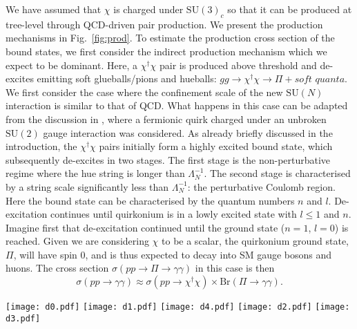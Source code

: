 We have assumed that $\chi$ is charged under $\mathrm{SU}(3)_{c}$ so that it can
be produced at tree-level through QCD-driven pair production. We present the
production mechanisms in Fig.~\ref{fig:prod}. To estimate the production cross
section of the bound states, we first consider the indirect production mechanism
which we expect to be dominant. Here, a $\chi^\dagger \chi$ pair is produced
above threshold and de-excites emitting soft glueballs/pions and hueballs:
$gg \rightarrow \chi^\dagger \chi \rightarrow \Pi + \textit{soft quanta}$. We
first consider the case where the confinement scale of the new $\mathrm{SU}(N)$
interaction is similar to that of QCD. What happens in this case can be adapted
from the discussion in \cite{Carlson:1991zn}, where a fermionic quirk charged
under an unbroken $\mathrm{SU}(2)$ gauge interaction was considered. As already
briefly discussed in the introduction, the $\chi^\dagger \chi$ pairs initially
form a highly excited bound state, which subsequently de-excites in two stages.
The first stage is the non-perturbative regime where the hue string is longer
than $\Lambda_{N}^{-1}$. The second stage is characterised by a string scale
significantly less than $\Lambda_{N}^{-1}$: the perturbative Coulomb region.
Here the bound state can be characterised by the quantum numbers $n$ and $l$.
De-excitation continues until quirkonium is in a lowly excited state with
$l \leq 1$ and $n$. Imagine first that de-excitation continued until the ground
state ($n=1$, $l=0$) is reached. Given we are considering $\chi$ to be a scalar,
the quirkonium ground state, $\Pi$, will have spin 0, and is thus expected to
decay into SM gauge bosons and huons. The cross section
$\sigma(pp \rightarrow \Pi \rightarrow \gamma \gamma)$ in this case is then
\begin{equation}
  \sigma (pp \rightarrow \gamma \gamma) \approx \sigma(pp \rightarrow \chi^\dagger
  \chi) \times \text{Br}(\Pi \rightarrow \gamma \gamma).
\end{equation}
\begin{figure*}[t]
  \centering
  \texttt{[image: d0.pdf]}
  \texttt{[image: d1.pdf]}
  \texttt{[image: d4.pdf]}
  \texttt{[image: d2.pdf]}
  \texttt{[image: d3.pdf]}
  \caption{Tree-level pair production mechanisms for the scalar quirk $\chi$.}
  \label{fig:prod}
\end{figure*}

